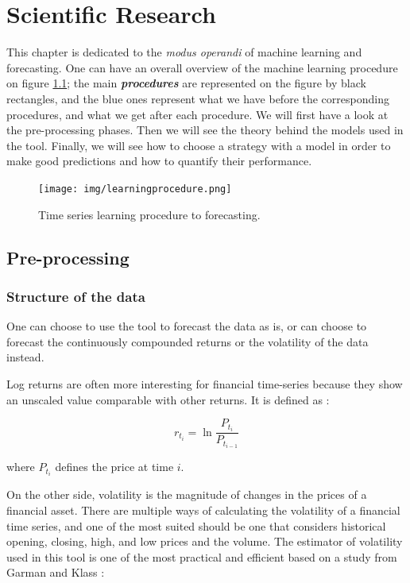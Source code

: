 \documentclass[11pt,a4paper,oneside]{book}
\begin{document}
\chapter{Scientific Research}

This chapter is dedicated to the \textit{modus operandi} of machine learning and forecasting. One can have an overall overview of the machine learning procedure on figure \ref{fig:ML}; the main \textit{\textbf{procedures}} are represented on the figure by black rectangles, and the blue ones represent what we have before the corresponding procedures, and what we get after each procedure. We will first have a look at the pre-processing phases. Then we will see the theory behind the models used in the tool. Finally, we will see how to choose a strategy with a model in order to make good predictions and how to quantify their performance.

\begin{figure}[ht]
  \centering
    \texttt{[image: img/learningprocedure.png]}
  \caption{Time series learning procedure to forecasting.}
  \label{fig:ML}
\end{figure}



\section{Pre-processing}

\subsection{Structure of the data}

One can choose to use the tool to forecast the data as is, or can choose to forecast the continuously compounded returns or the volatility of the data instead.

Log returns are often more interesting for financial time-series because they show an unscaled value comparable with other returns. It is defined as :

\begin{equation}
r_{t_i} = \ln\frac{P_{t_i}}{P_{t_{i-1}}}
\end{equation}

where $P_{t_i}$ defines the price at time $i$.

On the other side, volatility is the magnitude of changes in the prices of a financial asset. There are multiple ways of calculating the volatility of a financial time series, and one of the most suited should be one that considers historical opening, closing, high, and low
prices and the volume. The estimator of volatility used in this tool is one of the most practical and efficient based on a study from Garman and Klass \cite{garm}:
\end{document}
